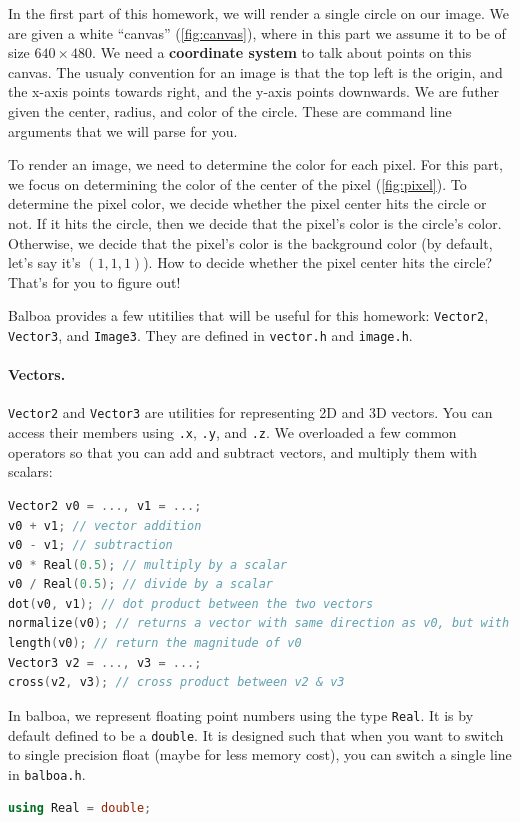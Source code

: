 In the first part of this homework, we will render a single circle on our image. We are given a white ``canvas'' (\cref{fig:canvas}), where in this part we assume it to be of size $640 \times 480$. We need a \textbf{coordinate system} to talk about points on this canvas. The usualy convention for an image is that the top left is the origin, and the x-axis points towards right, and the y-axis points downwards. We are futher given the center, radius, and color of the circle. These are command line arguments that we will parse for you.

To render an image, we need to determine the color for each pixel. For this part, we focus on determining the color of the center of the pixel (\cref{fig:pixel}). To determine the pixel color, we decide whether the pixel center hits the circle or not. If it hits the circle, then we decide that the pixel's color is the circle's color. Otherwise, we decide that the pixel's color is the background color (by default, let's say it's $(1, 1, 1)$). How to decide whether the pixel center hits the circle? That's for you to figure out!

Balboa provides a few utitilies that will be useful for this homework: \lstinline{Vector2}, \lstinline{Vector3}, and \lstinline{Image3}. They are defined in \lstinline{vector.h} and \lstinline{image.h}. 

\paragraph{Vectors.} \lstinline{Vector2} and \lstinline{Vector3} are utilities for representing 2D and 3D vectors. You can access their members using \lstinline{.x}, \lstinline{.y}, and \lstinline{.z}. We overloaded a few common operators so that you can add and subtract vectors, and multiply them with scalars:
\begin{lstlisting}[language=C++]
Vector2 v0 = ..., v1 = ...;
v0 + v1; // vector addition
v0 - v1; // subtraction
v0 * Real(0.5); // multiply by a scalar
v0 / Real(0.5); // divide by a scalar
dot(v0, v1); // dot product between the two vectors
normalize(v0); // returns a vector with same direction as v0, but with magnitude of 1
length(v0); // return the magnitude of v0
Vector3 v2 = ..., v3 = ...;
cross(v2, v3); // cross product between v2 & v3
\end{lstlisting}
In balboa, we represent floating point numbers using the type \lstinline{Real}. It is by default defined to be a \lstinline{double}. It is designed such that when you want to switch to single precision float (maybe for less memory cost), you can switch a single line in \lstinline{balboa.h}.
\begin{lstlisting}[language=C++]
using Real = double;
\end{lstlisting}

